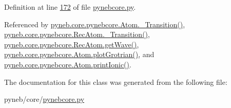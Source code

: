 Definition at line \hyperlink{pynebcore_8py_source_l00172}{172} of file \hyperlink{pynebcore_8py_source}{pynebcore.\-py}.



Referenced by \hyperlink{pynebcore_8py_source_l01433}{pyneb.\-core.\-pynebcore.\-Atom.\-\_\-\-Transition()}, \hyperlink{pynebcore_8py_source_l02812}{pyneb.\-core.\-pynebcore.\-Rec\-Atom.\-\_\-\-Transition()}, \hyperlink{pynebcore_8py_source_l02699}{pyneb.\-core.\-pynebcore.\-Rec\-Atom.\-get\-Wave()}, \hyperlink{pynebcore_8py_source_l02443}{pyneb.\-core.\-pynebcore.\-Atom.\-plot\-Grotrian()}, and \hyperlink{pynebcore_8py_source_l02233}{pyneb.\-core.\-pynebcore.\-Atom.\-print\-Ionic()}.



The documentation for this class was generated from the following file\-:\begin{DoxyCompactItemize}
\item 
pyneb/core/\hyperlink{pynebcore_8py}{pynebcore.\-py}\end{DoxyCompactItemize}

